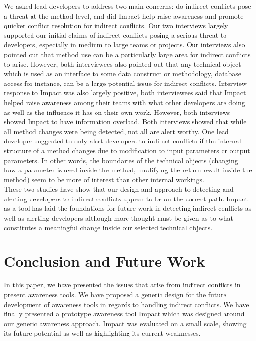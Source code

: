 \documentclass[conference]{IEEEtran}
\begin{document}
We asked lead developers to address two main concerns: do indirect
conflicts pose a threat at the method level, and did Impact help raise
awareness and promote quicker conflict resolution for indirect
conflicts. Our two interviews largely supported our initial claims of
indirect conflicts posing a serious threat to developers, especially
in medium to large teams or projects. Our interviews also pointed
out that method use can be a particularly large area for indirect
conflicts to arise. However, both interviewees also pointed out that
any technical object which is used as an interface to some data
construct or methodology, database access for instance, can be 
a large potential issue for indirect conflicts.  Interview response to
Impact was also largely positive, both interviewees said that Impact
helped raise awareness among their teams with what other developers
are doing as well as the influence it has on their own work. However,
both interviews showed Impact to have information overload. Both
interviews showed that while all method changes were being detected,
not all are alert worthy. One lead developer suggested to only alert
developers to indirect conflicts if the internal structure of a method
changes due to modification to input parameters or output parameters.
In other words, the boundaries of the technical objects (changing
how a parameter is used inside the method, modifying the return
result inside the method) seem to be more of interest than other 
internal workings.\\

These two studies have show that our design and approach to
detecting and alerting developers to indirect conflicts appear
to be on the correct path. Impact as a tool has laid the foundations
for future work in detecting indirect conflicts as well as alerting
developers although more thought must be given as to 
what constitutes a meaningful change inside our selected 
technical objects.\\


\section{Conclusion and Future Work}
In this paper, we have presented the issues that arise from indirect 
conflicts in present awareness tools. We have proposed a generic 
design for the future development of awareness tools in regards to
handling indirect conflicts. We have finally presented a prototype 
awareness tool Impact which was designed around our generic 
awareness approach. Impact was evaluated on a small scale, showing
its future potential as well as highlighting its current weaknesses.\\
\end{document}
